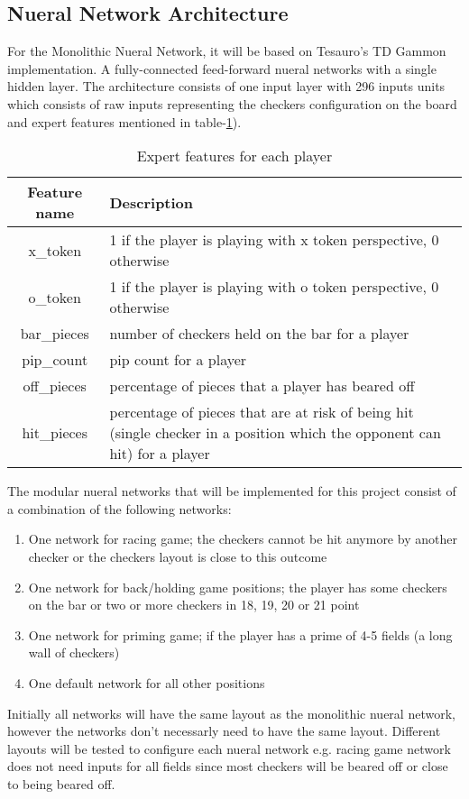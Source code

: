 \documentclass[12pt,a4paper]{article}
\begin{document}
\subsection{Nueral Network Architecture} \label{modnet}
For the Monolithic Nueral Network, it will be based on Tesauro's TD Gammon implementation. A fully-connected feed-forward nueral networks with a single hidden layer. The architecture consists of one input layer with 296 inputs units which consists of raw inputs representing the checkers configuration on the board and expert features mentioned in table-\ref{exfeat}).
\begin{table}[htb]
    \centering
    \caption{Expert features for each player}
    \vspace*{6pt}
    \label{exfeat}
    \begin{tabular}{cp{12cm}}
        \hline
        \hline
        Feature name & Description \\ 
        \hline
        x\_token & 1 if the player is playing with x token perspective, 0 otherwise \\
        \hline
        o\_token & 1 if the player is playing with o token perspective, 0 otherwise \\
        \hline
        bar\_pieces & number of checkers held on the bar for a player\\
        \hline
        pip\_count & pip count for a player \\
        \hline
        off\_pieces & percentage of pieces that a player has beared off \\
        \hline
        hit\_pieces & percentage of pieces that are at risk of being hit (single checker in a position which the opponent can hit) for a player \\
        \hline
    \end{tabular}
\end{table}

The modular nueral networks that will be implemented for this project consist of a combination of the following networks:
\begin{enumerate}
    \item One network for racing game; the checkers cannot be hit anymore by another checker or the checkers layout is close to this outcome
    \item One network for back/holding game positions; the player has some checkers on the bar or two or more checkers in 18, 19, 20 or 21 point
    \item One network for priming game; if the player has a prime of 4-5 fields (a long wall of checkers)
    \item One default network for all other positions
\end{enumerate}
Initially all networks will have the same layout as the monolithic nueral network, however the networks don't necessarly need to have the same layout. Different layouts will be tested to configure each nueral network e.g. racing game network does not need inputs for all fields since most checkers will be beared off or close to being beared off.
\end{document}
